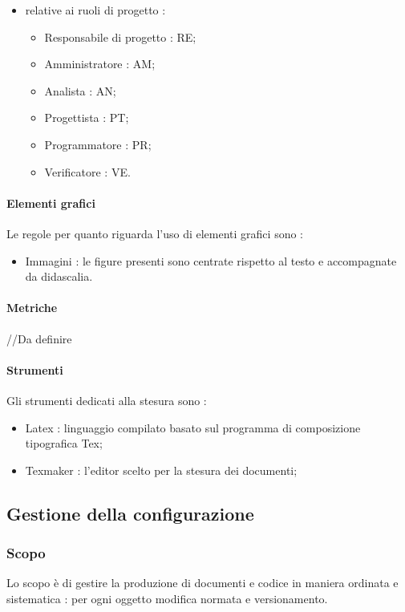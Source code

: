 \begin{itemize}
\begin{itemize}
\item relative ai ruoli di progetto :
\begin{itemize}
\item Responsabile di progetto : RE;
\item Amministratore : AM;
\item Analista : AN;
\item Progettista : PT;
\item Programmatore : PR;
\item Verificatore : VE.
\end{itemize}
\end{itemize}
\end{itemize}

\paragraph{Elementi grafici}
Le regole per quanto riguarda l’uso di elementi grafici sono :
\begin{itemize}
\item Immagini : le figure presenti sono centrate rispetto al testo e accompagnate da didascalia.
\end{itemize}

\paragraph{Metriche}
//Da definire

\paragraph{Strumenti}
Gli strumenti dedicati alla stesura sono :
\begin{itemize}
\item Latex : linguaggio compilato basato sul programma di composizione tipografica Tex;
\item Texmaker : l’editor scelto per la stesura dei documenti;
\end{itemize}

\subsection{Gestione della configurazione}
\subsubsection{Scopo}
Lo scopo è di gestire la produzione di documenti e codice in maniera ordinata e sistematica : per ogni oggetto modifica normata e versionamento.

